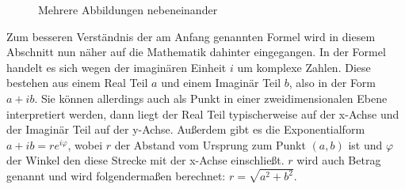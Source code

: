 \begin{figure}[bth]
  \hfill
  \hfill
  \centering{}
  \caption{Mehrere Abbildungen nebeneinander}
  \label{fig:dftEinzelneFrequenzen}
\end{figure}

Zum besseren Verständnis der am Anfang genannten Formel wird in diesem Abschnitt nun näher auf die Mathematik dahinter eingegangen. In der Formel handelt es sich wegen der imaginären Einheit $i$ um komplexe Zahlen. Diese bestehen aus einem Real Teil $a$ und einem Imaginär Teil $b$, also in der Form $a + ib$. Sie können allerdings auch als Punkt in einer zweidimensionalen Ebene interpretiert werden, dann liegt der Real Teil typischerweise auf der x-Achse und der Imaginär Teil auf der y-Achse. Außerdem gibt es die Exponentialform $a+ib=re^{i\varphi}$, wobei $r$ der Abstand vom Ursprung zum Punkt $(a,b)$ ist und $\varphi$ der Winkel den diese Strecke mit der x-Achse einschließt. $r$ wird auch Betrag genannt und wird folgendermaßen berechnet: $r=\sqrt{a^2+b^2}$. 